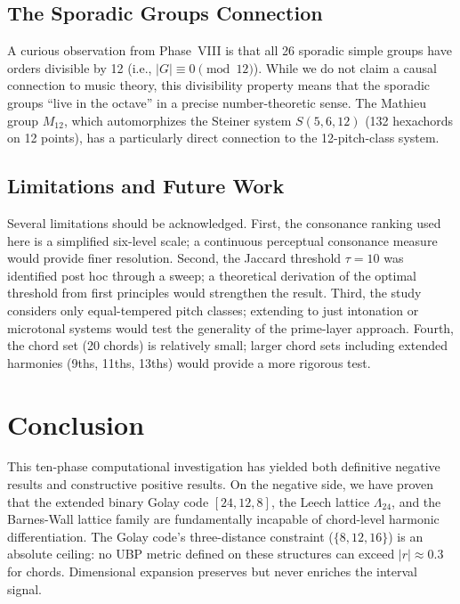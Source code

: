 \documentclass[11pt,a4paper]{article}
\theoremstyle{definition}
\begin{document}
\subsection{The Sporadic Groups Connection}

A curious observation from Phase~VIII is that all 26 sporadic simple groups have orders divisible by 12 (i.e., $|G| \equiv 0 \pmod{12}$). While we do not claim a causal connection to music theory, this divisibility property means that the sporadic groups ``live in the octave'' in a precise number-theoretic sense. The Mathieu group $M_{12}$, which automorphizes the Steiner system $S(5, 6, 12)$ (132 hexachords on 12 points), has a particularly direct connection to the 12-pitch-class system.

\subsection{Limitations and Future Work}

Several limitations should be acknowledged. First, the consonance ranking used here is a simplified six-level scale; a continuous perceptual consonance measure would provide finer resolution. Second, the Jaccard threshold $\tau = 10$ was identified post hoc through a sweep; a theoretical derivation of the optimal threshold from first principles would strengthen the result. Third, the study considers only equal-tempered pitch classes; extending to just intonation or microtonal systems would test the generality of the prime-layer approach. Fourth, the chord set (20 chords) is relatively small; larger chord sets including extended harmonies (9ths, 11ths, 13ths) would provide a more rigorous test.

\section{Conclusion}\label{sec:conclusion}

This ten-phase computational investigation has yielded both definitive negative results and constructive positive results. On the negative side, we have proven that the extended binary Golay code $[24, 12, 8]$, the Leech lattice $\Lambda_{24}$, and the Barnes-Wall lattice family are fundamentally incapable of chord-level harmonic differentiation. The Golay code's three-distance constraint ($\{8, 12, 16\}$) is an absolute ceiling: no UBP metric defined on these structures can exceed $|r| \approx 0.3$ for chords. Dimensional expansion preserves but never enriches the interval signal.
\end{document}
